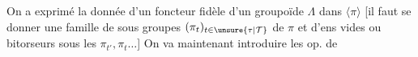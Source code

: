 On a exprimé la donnée d'un foncteur fidèle d'un groupoïde $\Lambda$ dans $\langle\pi\rangle$  [il faut se donner une famille de sous groupes $(\pi_t)_{t\in\unsure{\tau|\mathcal T}}$ de $\pi$ et d'ens vides ou bitorseurs sous les $\pi_{t'},\pi_t\ldots$] On va maintenant introduire les op. de
